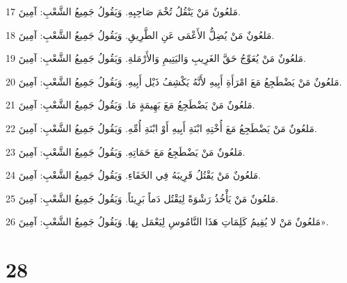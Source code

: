 \par 17 مَلعُونٌ مَنْ يَنْقُلُ تُخْمَ صَاحِبِهِ. وَيَقُولُ جَمِيعُ الشَّعْبِ: آمِينَ.
\par 18 مَلعُونٌ مَنْ يُضِلُّ الأَعْمَى عَنِ الطَّرِيقِ. وَيَقُولُ جَمِيعُ الشَّعْبِ: آمِينَ.
\par 19 مَلعُونٌ مَنْ يُعَوِّجُ حَقَّ الغَرِيبِ وَاليَتِيمِ وَالأَرْمَلةِ. وَيَقُولُ جَمِيعُ الشَّعْبِ: آمِينَ.
\par 20 مَلعُونٌ مَنْ يَضْطَجِعُ مَعَ امْرَأَةِ أَبِيهِ لأَنَّهُ يَكْشِفُ ذَيْل أَبِيهِ. وَيَقُولُ جَمِيعُ الشَّعْبِ: آمِينَ.
\par 21 مَلعُونٌ مَنْ يَضْطَجِعُ مَعَ بَهِيمَةٍ مَا. وَيَقُولُ جَمِيعُ الشَّعْبِ: آمِينَ.
\par 22 مَلعُونٌ مَنْ يَضْطَجِعُ مَعَ أُخْتِهِ ابْنَةِ أَبِيهِ أَوْ ابْنَةِ أُمِّهِ. وَيَقُولُ جَمِيعُ الشَّعْبِ: آمِينَ.
\par 23 مَلعُونٌ مَنْ يَضْطَجِعُ مَعَ حَمَاتِهِ. وَيَقُولُ جَمِيعُ الشَّعْبِ: آمِينَ.
\par 24 مَلعُونٌ مَنْ يَقْتُلُ قَرِيبَهُ فِي الخَفَاءِ. وَيَقُولُ جَمِيعُ الشَّعْبِ: آمِينَ.
\par 25 مَلعُونٌ مَنْ يَأْخُذُ رَشْوَةً لِيَقْتُل دَماً بَرِيئاً. وَيَقُولُ جَمِيعُ الشَّعْبِ: آمِينَ.
\par 26 مَلعُونٌ مَنْ لا يُقِيمُ كَلِمَاتِ هَذَا النَّامُوسِ لِيَعْمَل بِهَا. وَيَقُولُ جَمِيعُ الشَّعْبِ: آمِينَ».

\chapter{28}

